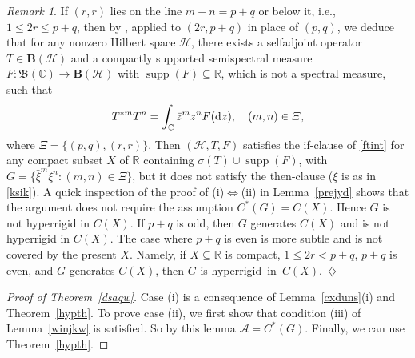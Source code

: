 \documentclass[reqno]{amsproc}
\DeclareMathOperator{\supp}{supp}
\numberwithin{equation}{section}
\theoremstyle{remark}
\newtheorem{rem}[theorem]{Remark}
\newcommand*{\ascr}{\mathscr{A}}
\newcommand*{\hh}{\mathcal{H}}
\newcommand*{\comp}{\mathbb{C}}
\newcommand*{\borel}{\mathfrak{B}}
\newcommand*{\cbb}{\comp}
\newcommand*{\D}{\mathrm{d\hspace{.1ex}}}
\theoremstyle{definition}
\newcommand*{\Le}{\leqslant}
\newcommand*{\ogr}{\boldsymbol{B}}
\newcommand*{\rbb}{\mathbb{R}}
\begin{document}
   \begin{rem} \label{ytsq}
If $(r,r)$ lies on the line $m+n=p+q$ or below it,
i.e., $1\Le 2r \Le p+q$, then by
\cite[Theorem~5.2]{P-S22-b}, applied to $(2r,p+q)$ in
place of $(p,q)$, we deduce that for any nonzero
Hilbert space $\hh$, there exists a selfadjoint
operator $T\in \ogr(\hh)$ and a compactly supported
semispectral measure $F\colon \borel(\cbb) \to
\ogr(\hh)$ with $\supp(F) \subseteq \rbb$, which is
not a spectral measure, such that \allowdisplaybreaks
   \begin{align*}
T^{*m}T^n= \int_{\cbb} \bar z^m z^n F(\D z), \quad
(m,n)\in \varXi,
   \end{align*}
where $\varXi=\{(p,q),(r,r)\}$. Then $(\hh,T,F)$
satisfies the if-clause of \eqref{ftint} for any
compact subset $X$ of $\rbb$ containing $\sigma(T)
\cup \supp(F)$, with $G=\{\bar \xi^m\xi^n\colon
(m,n)\in \varXi\}$, but it does not satisfy the
then-clause ($\xi$ is as in \eqref{ksik}). A quick
inspection of the proof of
\textup{(i)}$\Leftrightarrow$\textup{(ii)} in
Lemma~\ref{prejyd} shows that the argument does not
require the assumption $C^*(G)=C(X)$. Hence $G$ is not
hyperrigid in $C(X)$. If $p+q$ is odd, then $G$
generates $C(X)$ and is not hyperrigid in $C(X)$. The
case where $p+q$ is even is more subtle and is not
covered by the present $X$. Namely, if $X\subseteq
\mathbb{R}$ is compact, $1\Le 2r<p+q$, $p+q$ is even,
and $G$ generates $C(X)$, then $G$ is
hyperrigid~in~$C(X)$.~\hfill $\diamondsuit$
   \end{rem}
   \begin{proof}[Proof of Theorem~\ref{dsaqw}]
Case (i) is a consequence of Lemma~\ref{cxduns}(i) and
Theorem~\ref{hypth}. To prove case (ii), we first show
that condition (iii) of Lemma~\ref{winjkw} is
satisfied. So by this lemma $\ascr=C^*(G)$. Finally,
we can use Theorem~\ref{hypth}.
   \end{proof}
\end{document}
